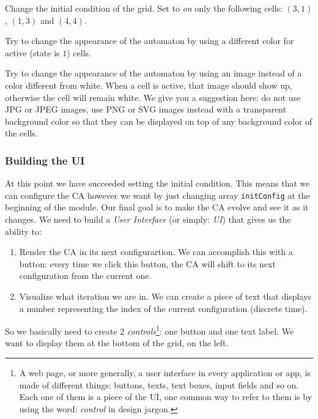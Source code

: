\begin{problem}
\label{prob:changeinit}
Change the initial condition of the grid. Set to \textit{on} only the following
cells: $(3,1)$, $(1,3)$ and $(4,4)$.
\end{problem}

\begin{problem}
\label{prob:cacolor}
Try to change the appearance of the automaton by using a different color for active (state is $1$)
cells.
\end{problem}

\begin{problem}
\label{prob:flowers}
Try to change the appearance of the automaton by using an image instead of a color different from white.
When a cell is active, that image should show up, otherwise the cell will remain white.
We give you a suggestion here: do not use JPG or JPEG images, use PNG or SVG images instead with a transparent
background color so that they can be displayed on top of any background color of the cells.
\end{problem}

\subsubsection{Building the UI}
At this point we have succeeded setting the initial condition. This means that we can configure the CA however
we want by just changing array \texttt{initConfig} at the beginning of the module. Our final goal is to
make the CA evolve and see it as it changes. We need to build a \textit{User Interface} (or simply: \textit{UI})
that gives us the ability to:

\begin{enumerate}
\item Render the CA in its next configurartion. We can accomplish this with a button: every time we
click this button, the CA will shift to its next configuration from the current one.
\item Visualize what iteration we are in. We can create a piece of text that displays a number
representing the index of the current configuration (discrete time).
\end{enumerate}

So we basically need to create 2
\textit{controls}\footnote{A web page, or more generally, a user interface in every application or app, is made
of different things: buttons, texts, text boxes, input fields and so on. Each one of them is a piece of the UI,
one common way to refer to them is by using the word: \textit{control} in design jargon.}: one button and
one text label. We want to display them at the bottom of the grid, on the left.

